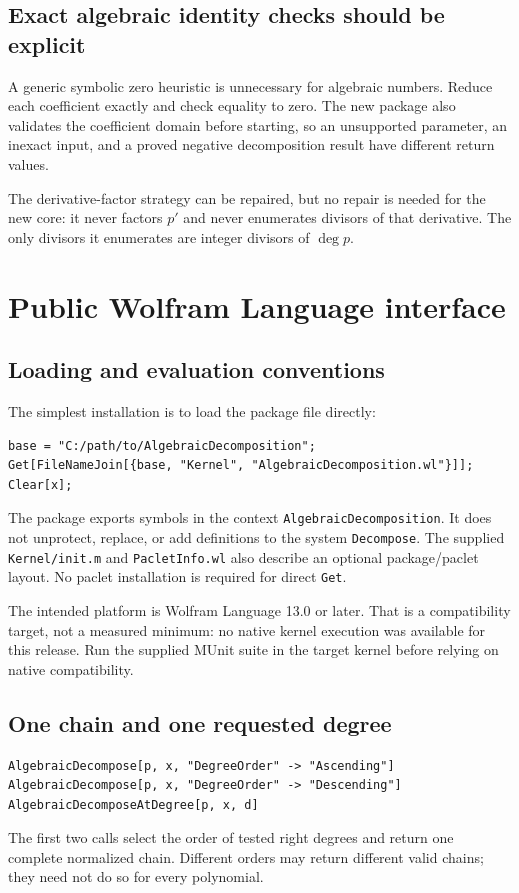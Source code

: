 \documentclass[11pt,letterpaper]{article}
\theoremstyle{definition}
\theoremstyle{remark}
\newcommand{\wt}[1]{\texttt{#1}}
\begin{document}
\subsection{Exact algebraic identity checks should be explicit}
A generic symbolic zero heuristic is unnecessary for algebraic numbers.
Reduce each coefficient exactly and check equality to zero. The new
package also validates the coefficient domain before starting, so an
unsupported parameter, an inexact input, and a proved negative
decomposition result have different return values.

The derivative-factor strategy can be repaired, but no repair is needed
for the new core: it never factors $p'$ and never enumerates divisors of
that derivative. The only divisors it enumerates are integer divisors of
$\deg p$.

\section{Public Wolfram Language interface}
\label{sec:api}

\subsection{Loading and evaluation conventions}
The simplest installation is to load the package file directly:
\begin{lstlisting}
base = "C:/path/to/AlgebraicDecomposition";
Get[FileNameJoin[{base, "Kernel", "AlgebraicDecomposition.wl"}]];
Clear[x];
\end{lstlisting}
The package exports symbols in the context
\wt{AlgebraicDecomposition\textasciigrave}. It does not unprotect,
replace, or add definitions to the system \wt{Decompose}.
The supplied \wt{Kernel/init.m} and \wt{PacletInfo.wl} also describe
an optional package/paclet layout. No paclet installation is required
for direct \wt{Get}.

The intended platform is Wolfram Language 13.0 or later. That is a
compatibility target, not a measured minimum: no native kernel execution
was available for this release. Run the supplied MUnit suite in the target
kernel before relying on native compatibility.

\subsection{One chain and one requested degree}
\begin{lstlisting}
AlgebraicDecompose[p, x, "DegreeOrder" -> "Ascending"]
AlgebraicDecompose[p, x, "DegreeOrder" -> "Descending"]
AlgebraicDecomposeAtDegree[p, x, d]
\end{lstlisting}
The first two calls select the order of tested right degrees and return
one complete normalized chain. Different orders may return different
valid chains; they need not do so for every polynomial.
\end{document}
